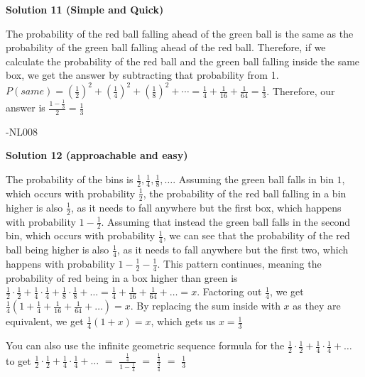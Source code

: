 \begin{enumerate}
 



\textbf{Solution 11 (Simple and Quick)}

The probability of the red ball falling ahead of the green ball is the same as the probability of the green ball falling ahead of the red ball. Therefore, if we calculate the probability of the red ball and the green ball falling inside the same box, we get the answer by subtracting that probability from 1. $P(same) = \left(\frac{1}{2}\right)^2 + \left(\frac{1}{4}\right)^2 + \left(\frac{1}{8}\right)^2 + \cdots = \frac{1}{4} + \frac{1}{16} + \frac{1}{64} = \frac{1}{3}$. Therefore, our answer is $\frac{1-\frac{1}{3}}{2} = \boxed{\frac{1}{3}}$

 -NL008

 



\textbf{Solution 12 (approachable and easy)}

The probability of the bins is $\frac{1}{2}, \frac{1}{4}, \frac{1}{8}, \ldots$. Assuming the green ball falls in bin $1$, which occurs with probability $\frac{1}{2}$, the probability of the red ball falling in a bin higher is also $\frac{1}{2}$, as it needs to fall anywhere but the first box, which happens with probability $1 - \frac{1}{2}$. Assuming that instead the green ball falls in the second bin, which occurs with probability $\frac{1}{4}$, we can see that the probability of the red ball being higher is also $\frac{1}{4}$, as it needs to fall anywhere but the first two, which happens with probability $1 - \frac{1}{2} - \frac{1}{4}$. This pattern continues, meaning the probability of red being in a box higher than green is $\frac{1}{2} \cdot \frac{1}{2} + \frac{1}{4} \cdot \frac{1}{4} + \frac{1}{8} \cdot \frac{1}{8} + \ldots = \frac{1}{4} + \frac{1}{16} + \frac{1}{64} + \ldots = x$. Factoring out $\frac{1}{4}$, we get $\frac{1}{4}\left(1 + \frac{1}{4} + \frac{1}{16} + \frac{1}{64} + \ldots\right) = x$. By replacing the sum inside with $x$ as they are equivalent, we get $\frac{1}{4}\left(1+x\right) = x$, which gets us $x = \boxed{\frac{1}{3}}$

 
You can also use the infinite geometric sequence formula for the $\frac{1}{2}\cdot\frac{1}{2}+\frac{1}{4}\cdot\frac{1}{4}+\ldots$ to get $\frac{1}{2}\cdot\frac{1}{2}+\frac{1}{4}\cdot\frac{1}{4}+\ldots$ $=$ $\frac{\frac{1}{4}}{1-\frac{1}{4}}$ $=$ $\frac{\frac{1}{4}}{\frac{3}{4}}$ $=$ $\boxed{\frac{1}{3}}$




\end{enumerate}
